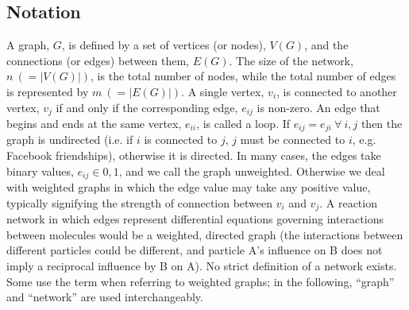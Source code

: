 \documentclass[11pt]{article}
\begin{document}
\subsection{Notation}
A graph, $G$, is defined by a set of vertices (or nodes), $V(G)$, and the connections (or edges) between them, $E(G)$. The size of the network, $n \ ( = |V(G)|)$, is the total number of nodes, while the total number of edges is represented by $m \ (= |E(G)|)$. A single vertex, $v_{i}$, is connected to another vertex, $v_{j}$ if and only if the corresponding edge, $e_{ij}$ is non-zero. An edge that begins and ends at the same vertex, $e_{ii}$, is called a loop. If $e_{ij} = e_{ji} \ \forall \ i,j$ then the graph is undirected (i.e. if $i$ is connected to $j$, $j$ must be connected to $i$, e.g. Facebook friendships), otherwise it is directed. In many cases, the edges take binary values, $e_{ij} \in {0,1}$, and we call the graph unweighted. Otherwise we deal with weighted graphs in which the edge value may take any positive value, typically signifying the strength of connection between $v_{i}$ and $v_{j}$. A reaction network in which edges represent differential equations governing interactions between molecules would be a weighted, directed graph (the interactions between different particles could be different, and particle A's influence on B does not imply a reciprocal influence by B on A). No strict definition of a network exists. Some use the term when referring to weighted graphs; in the following, ``graph'' and ``network'' are used interchangeably. \vspace{1mm}
\end{document}
